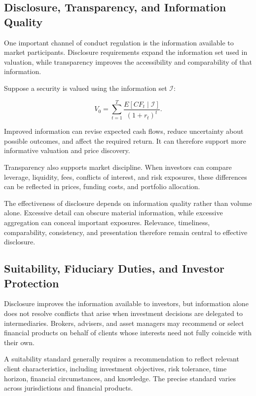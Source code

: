 \subsection{Disclosure, Transparency, and Information Quality}

One important channel of conduct regulation is the information available to market participants. Disclosure requirements expand the information set used in valuation, while transparency improves the accessibility and comparability of that information.

Suppose a security is valued using the information set \(\mathcal{I}\):

\begin{equation}
V_0
=\sum_{t=1}^{T}
\frac{E[CF_t\mid\mathcal{I}]}{(1+r_t)^t}.
\label{eq:ch23-information-valuation}
\end{equation}

Improved information can revise expected cash flows, reduce uncertainty about possible outcomes, and affect the required return. It can therefore support more informative valuation and price discovery.

Transparency also supports market discipline. When investors can compare leverage, liquidity, fees, conflicts of interest, and risk exposures, these differences can be reflected in prices, funding costs, and portfolio allocation.

The effectiveness of disclosure depends on information quality rather than volume alone. Excessive detail can obscure material information, while excessive aggregation can conceal important exposures. Relevance, timeliness, comparability, consistency, and presentation therefore remain central to effective disclosure.

\subsection{Suitability, Fiduciary Duties, and Investor Protection}

Disclosure improves the information available to investors, but information alone does not resolve conflicts that arise when investment decisions are delegated to intermediaries. Brokers, advisers, and asset managers may recommend or select financial products on behalf of clients whose interests need not fully coincide with their own.

A suitability standard generally requires a recommendation to reflect relevant client characteristics, including investment objectives, risk tolerance, time horizon, financial circumstances, and knowledge. The precise standard varies across jurisdictions and financial products.

